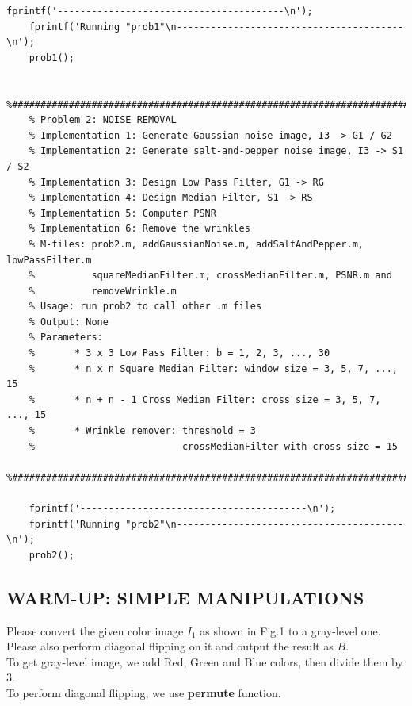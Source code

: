 \documentclass{article}
\newcommand{\tb}{\textbf}
\begin{document}
\begin{lstlisting}[caption = {README.m}]
    fprintf('----------------------------------------\n');
    fprintf('Running "prob1"\n----------------------------------------\n');
    prob1();
    
    %######################################################################### 
    % Problem 2: NOISE REMOVAL                                            
    % Implementation 1: Generate Gaussian noise image, I3 -> G1 / G2         
    % Implementation 2: Generate salt-and-pepper noise image, I3 -> S1 / S2
    % Implementation 3: Design Low Pass Filter, G1 -> RG
    % Implementation 4: Design Median Filter, S1 -> RS
    % Implementation 5: Computer PSNR
    % Implementation 6: Remove the wrinkles
    % M-files: prob2.m, addGaussianNoise.m, addSaltAndPepper.m, lowPassFilter.m
    %          squareMedianFilter.m, crossMedianFilter.m, PSNR.m and 
    %          removeWrinkle.m
    % Usage: run prob2 to call other .m files
    % Output: None
    % Parameters:
    %       * 3 x 3 Low Pass Filter: b = 1, 2, 3, ..., 30
    %       * n x n Square Median Filter: window size = 3, 5, 7, ..., 15
    %       * n + n - 1 Cross Median Filter: cross size = 3, 5, 7, ..., 15
    %       * Wrinkle remover: threshold = 3
    %                          crossMedianFilter with cross size = 15
    %#########################################################################
    
    fprintf('----------------------------------------\n');
    fprintf('Running "prob2"\n----------------------------------------\n');
    prob2();    
\end{lstlisting}

\newpage
\subsection*{WARM-UP: SIMPLE MANIPULATIONS}

Please convert the given color image $I_1$ as shown in Fig.1 to a gray-level one. Please also perform diagonal flipping on it and output the result as $B$. \\
To get gray-level image, we add Red, Green and Blue colors, then divide them by 3. \\
To perform diagonal flipping, we use \tb{permute} function.
\end{document}
